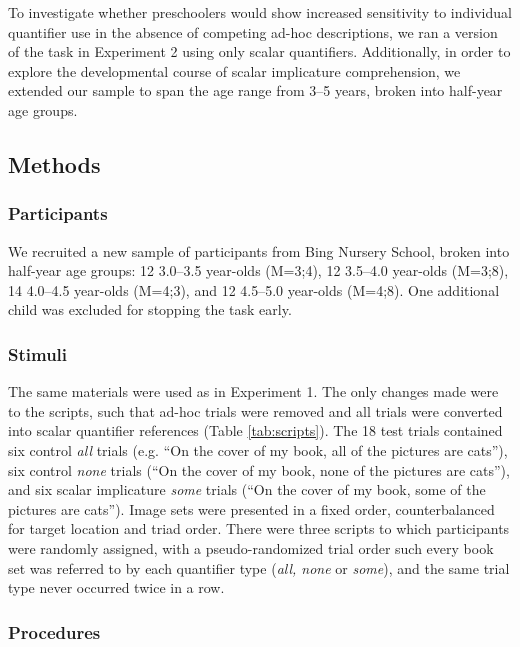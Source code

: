 \documentclass[10pt,letterpaper]{article}
\begin{document}
To investigate whether preschoolers would show increased sensitivity to individual quantifier use in the absence of competing ad-hoc descriptions, we ran a version of the task in Experiment 2 using only scalar quantifiers. Additionally, in order to explore the developmental course of scalar implicature comprehension, we extended our sample to span the age range from 3--5 years, broken into half-year age groups.

\subsection{Methods}

\subsubsection{Participants}

We recruited a new sample of participants from Bing Nursery School, broken into half-year age groups: 12 3.0--3.5 year-olds (M=3;4), 12 3.5--4.0 year-olds (M=3;8), 14 4.0--4.5 year-olds (M=4;3), and 12 4.5--5.0 year-olds (M=4;8).  One additional child was excluded for stopping the task early. 

\subsubsection{Stimuli}

The same materials were used as in Experiment 1. The only changes made were to the scripts, such that ad-hoc trials were removed and all trials were converted into scalar quantifier references (Table \ref{tab:scripts}).  The 18 test trials contained six control \emph{all} trials (e.g. ``On the cover of my book, all of the pictures are cats''), six control \emph{none} trials (``On the cover of my book, none of the pictures are cats''), and six scalar implicature \emph{some} trials (``On the cover of my book, some of the pictures are cats'').  Image sets were presented in a fixed order, counterbalanced for target location and triad order. There were three scripts to which participants were randomly assigned, with a pseudo-randomized trial order such every book set was referred to by each quantifier type (\emph{all, none} or \emph{some}), and the same trial type never occurred twice in a row.

\subsubsection{Procedures}
\end{document}

